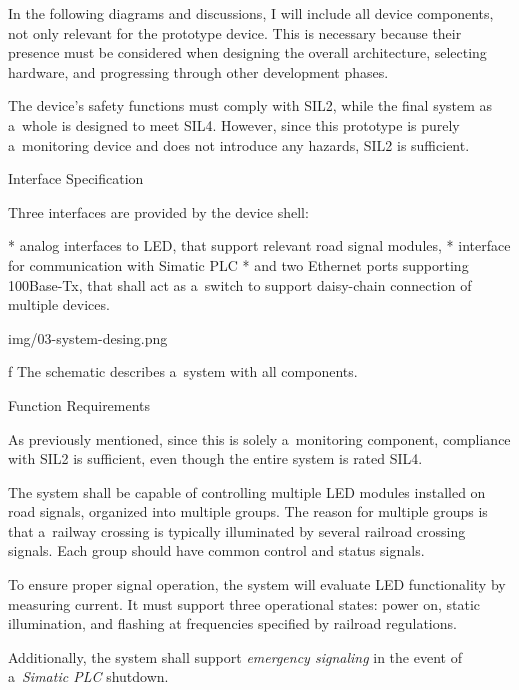 In the following diagrams and discussions, I will include all device components, not only relevant for the prototype device. This is necessary because their presence must be considered when designing the overall architecture, selecting hardware, and progressing through other development phases.

The device's safety functions must comply with SIL2, while the final system as a~whole is designed to meet SIL4. However, since this prototype is purely a~monitoring device and does not introduce any hazards, SIL2 is sufficient.

\secc Interface Specification

Three interfaces are provided by the device shell:

\begitems
* {\sbf analog interfaces} to LED, that support relevant road signal modules,
* interface for {\sbf communication with Simatic PLC}
* and {\sbf two Ethernet ports} supporting 100Base-Tx, that shall act as a~switch to support daisy-chain connection of multiple devices.
\enditems

\medskip
{}
\picw=12cm \cinspic img/03-system-desing.png
\caption/f The schematic describes a~system with all components.
\medskip

\secc Function Requirements

As previously mentioned, since this is solely a~monitoring component, compliance with SIL2 is sufficient, even though the entire system is rated SIL4. 

The system shall be capable of controlling multiple LED modules installed on road signals, organized into multiple groups. The reason for multiple groups is that a~railway crossing is typically illuminated by several railroad crossing signals. Each group should have common control and status signals.

To ensure proper signal operation, the system will evaluate LED functionality by measuring current. It must support three operational states: power on, static illumination, and flashing at frequencies specified by railroad regulations.  

Additionally, the system shall support {\it emergency signaling} in the event of a~{\it Simatic PLC} shutdown.

